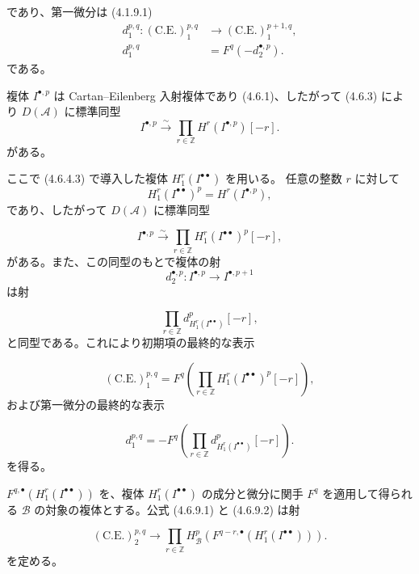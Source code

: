 \clearpage
{}%
\begingroup\small\setlength{\parskip}{0pt}\setlength{\emergencystretch}{1.5em}
\setlength{\abovedisplayskip}{4pt plus 2pt minus 2pt}%
\setlength{\belowdisplayskip}{4pt plus 2pt minus 2pt}%

\noindent であり、第一微分は (4.1.9.1)
\[
\begin{aligned}
d_1^{p,q}\colon(\mathrm{C.E.})_1^{p,q}
  &\longrightarrow(\mathrm{C.E.})_1^{p+1,q},\\
d_1^{p,q}&=F^q(-d_2^{\bullet,p}).
\end{aligned}
\]
である。

複体 $I^{\bullet,p}$ は Cartan--Eilenberg 入射複体であり (4.6.1)、したがって
(4.6.3) により $D(\mathcal A)$ に標準同型
\[
I^{\bullet,p}\xrightarrow{\sim}
\prod_{r\in\mathbb Z}H^r(I^{\bullet,p})[-r].
\]
がある。

ここで (4.6.4.3) で導入した複体 $H_1^r(I^{\bullet\bullet})$ を用いる。
任意の整数 $r$ に対して
\[
H_1^r(I^{\bullet\bullet})^p=H^r(I^{\bullet,p}),
\]
であり、したがって $D(\mathcal A)$ に標準同型

\[
I^{\bullet,p}\xrightarrow{\sim}
\prod_{r\in\mathbb Z}H_1^r(I^{\bullet\bullet})^p[-r],
\]
がある。また、この同型のもとで複体の射
\[
d_2^{\bullet,p}\colon
I^{\bullet,p}\longrightarrow I^{\bullet,p+1}
\]
は射

\[
\prod_{r\in\mathbb Z}
d_{H_1^r(I^{\bullet\bullet})}^{p}[-r],
\]
と同型である。これにより初期項の最終的な表示

\[
(\mathrm{C.E.})_1^{p,q}
=F^q\left(
\prod_{r\in\mathbb Z}H_1^r(I^{\bullet\bullet})^p[-r]
\right),
\tag{4.6.9.1}
\]
および第一微分の最終的な表示

\[
d_1^{p,q}
=-F^q\left(
\prod_{r\in\mathbb Z}d_{H_1^r(I^{\bullet\bullet})}^{p}[-r]
\right).
\tag{4.6.9.2}
\]
を得る。

$F^{q,\bullet}(H_1^r(I^{\bullet\bullet}))$ を、複体
$H_1^r(I^{\bullet\bullet})$ の成分と微分に関手 $F^q$ を適用して得られる
$\mathcal B$ の対象の複体とする。公式 (4.6.9.1) と (4.6.9.2) は射

\[
(\mathrm{C.E.})_2^{p,q}\longrightarrow
\prod_{r\in\mathbb Z}
H_{\mathcal B}^{p}\left(
F^{q-r,\bullet}(H_1^r(I^{\bullet\bullet}))
\right).
\tag{4.6.9.3}
\]
を定める。
\endgroup
